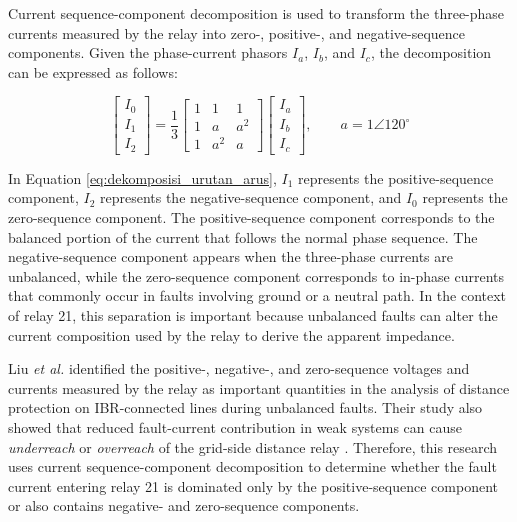Current sequence-component decomposition is used to transform the three-phase currents measured by the relay into zero-, positive-, and negative-sequence components. Given the phase-current phasors \(I_a\), \(I_b\), and \(I_c\), the decomposition can be expressed as follows:

\begin{equation}
    \begin{bmatrix}
        I_0 \\
        I_1 \\
        I_2
    \end{bmatrix}
    =
    \frac{1}{3}
    \begin{bmatrix}
        1 & 1 & 1       \\
        1 & a & a^2     \\
        1 & a^2 & a
    \end{bmatrix}
    \begin{bmatrix}
        I_a \\
        I_b \\
        I_c
    \end{bmatrix},
    \qquad a = 1\angle 120^\circ
    \label{eq:dekomposisi_urutan_arus}
\end{equation}

In Equation \ref{eq:dekomposisi_urutan_arus}, \(I_1\) represents the positive-sequence component, \(I_2\) represents the negative-sequence component, and \(I_0\) represents the zero-sequence component. The positive-sequence component corresponds to the balanced portion of the current that follows the normal phase sequence. The negative-sequence component appears when the three-phase currents are unbalanced, while the zero-sequence component corresponds to in-phase currents that commonly occur in faults involving ground or a neutral path. In the context of relay 21, this separation is important because unbalanced faults can alter the current composition used by the relay to derive the apparent impedance.

Liu \textit{et al.} identified the positive-, negative-, and zero-sequence voltages and currents measured by the relay as important quantities in the analysis of distance protection on IBR-connected lines during unbalanced faults. Their study also showed that reduced fault-current contribution in weak systems can cause \textit{underreach} or \textit{overreach} of the grid-side distance relay \cite{liu2025sequence}. Therefore, this research uses current sequence-component decomposition to determine whether the fault current entering relay 21 is dominated only by the positive-sequence component or also contains negative- and zero-sequence components.

